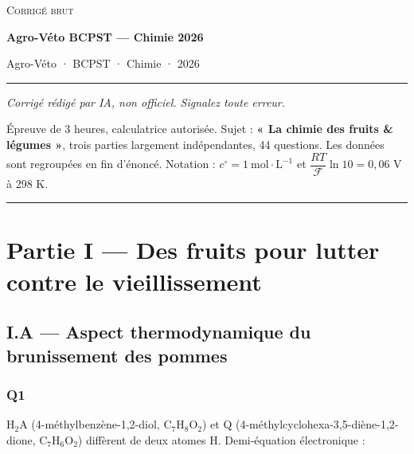\documentclass[11pt,a4paper]{article}
\begin{document}
\thispagestyle{plain}
\begin{center}
  {\small\scshape Corrigé brut}\par\smallskip
  {\LARGE\bfseries Agro-Véto BCPST — Chimie 2026\par}\medskip
  {\large Agro-Véto · BCPST · Chimie · 2026\par}
\end{center}
\vspace{2pt}\hrule\vspace{8pt}

\emph{Corrigé rédigé par IA, non officiel. Signalez toute erreur.}

Épreuve de 3 heures, calculatrice autorisée. Sujet : \textbf{« La chimie des fruits \& légumes »}, trois parties largement indépendantes, 44 questions. Les données sont regroupées en fin d'énoncé. Notation : \(c^\circ = 1\ \mathrm{mol\cdot L^{-1}}\) et \(\dfrac{RT}{\mathcal F}\ln 10 = 0{,}06\) V à 298 K.

\begin{center}\rule{0.5\linewidth}{0.5pt}\end{center}

\hypertarget{partie-i-des-fruits-pour-lutter-contre-le-vieillissement}{%
\section{Partie I --- Des fruits pour lutter contre le vieillissement}\label{partie-i-des-fruits-pour-lutter-contre-le-vieillissement}}

\hypertarget{i.a-aspect-thermodynamique-du-brunissement-des-pommes}{%
\subsection{I.A --- Aspect thermodynamique du brunissement des pommes}\label{i.a-aspect-thermodynamique-du-brunissement-des-pommes}}

\hypertarget{q1}{%
\subsubsection{Q1}\label{q1}}

\(\mathrm{H_2A}\) (4-\allowbreak{}méthylbenzène-\allowbreak{}1,2-\allowbreak{}diol, \(\mathrm{C_7H_8O_2}\)) et \(\mathrm Q\) (4-\allowbreak{}méthylcyclohexa-\allowbreak{}3,5-\allowbreak{}diène-\allowbreak{}1,2-\allowbreak{}dione, \(\mathrm{C_7H_6O_2}\)) diffèrent de deux atomes H. Demi-équation électronique :
\end{document}
